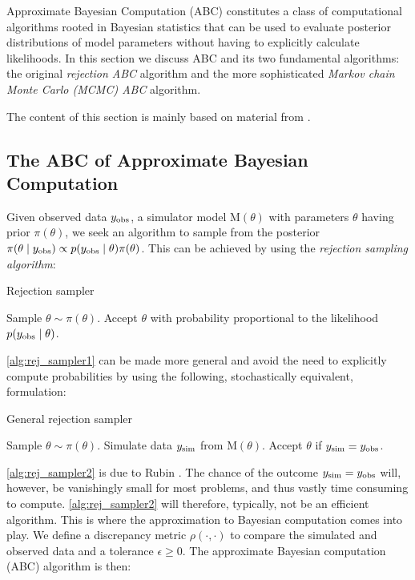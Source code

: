 Approximate Bayesian Computation (ABC) constitutes a class of computational algorithms rooted in Bayesian statistics that can be used to evaluate posterior distributions of model parameters without having to explicitly calculate likelihoods. In this section we discuss ABC and its two fundamental algorithms: the original \textit{rejection ABC} algorithm and the more sophisticated \textit{Markov chain Monte Carlo (MCMC) ABC} algorithm. 

The content of this section is mainly based on material from \cite{abc_handbook}.

\subsection{The ABC of Approximate Bayesian Computation}

Given observed data $y_\mathrm{obs}$, a simulator model $\mathrm{M}(\theta)$ with parameters $\theta$ having prior $\pi(\theta)$, we seek an algorithm to sample from the posterior $\pi \qty(\theta \mid y_\mathrm{obs}) \propto p \qty(y_\mathrm{obs} \mid \theta) \pi(\theta)$. This can be achieved by using the \textit{rejection sampling algorithm}: 

\begin{algorithm}[H]
\caption{Rejection sampler}
\label{alg:rej_sampler1}
\SetAlgoLined
\DontPrintSemicolon
 \nl Sample $\theta \sim \pi (\theta)$.\;
 \nl Accept $\theta$ with probability proportional to the likelihood $p\qty(y_\mathrm{obs} \mid \theta)$.\;
\end{algorithm}

\cref{alg:rej_sampler1} can be made more general and avoid the need to explicitly compute probabilities by using the following, stochastically equivalent, formulation: 

\begin{algorithm}[H]
\caption{General rejection sampler}
\label{alg:rej_sampler2}
\SetAlgoLined
\DontPrintSemicolon
\nl Sample $\theta \sim \pi (\theta)$.\;
\nl Simulate data $y_\mathrm{sim}$ from $\mathrm{M}(\theta)$.\;
\nl Accept $\theta$ if $y_\mathrm{sim} = y_\mathrm{obs}$.\;
\end{algorithm}

\cref{alg:rej_sampler2} is due to Rubin \cite{Rubin}. The chance of the outcome $y_\mathrm{sim} = y_\mathrm{obs}$ will, however, be vanishingly small for most problems, and thus vastly time consuming to compute. \cref{alg:rej_sampler2} will therefore, typically, not be an efficient algorithm. This is where the approximation to Bayesian computation comes into play. We define a discrepancy metric $\rho(\cdot, \cdot)$ to compare the simulated and observed data and a tolerance $\epsilon \geq 0$. The approximate Bayesian computation (ABC) algorithm is then: 

